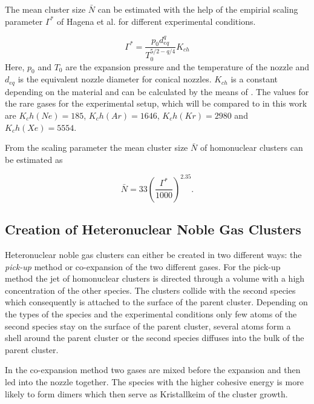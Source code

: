 \begin{figure}[h]
  \centering
  \caption{}
  \label{}
\end{figure}

The mean cluster size $\bar{N}$ can be estimated with
the help of the empirial scaling parameter $\Gamma^*$ of Hagena et al.
\cite{Hagena72} for different experimental conditions.

\begin{equation}
 \Gamma^* = \frac{p_0 d_{eq}^q}{T_0^{5/2-q/4}} K_{ch}
\end{equation}
Here, $p_0$ and $T_0$ are the expansion pressure and the temperature
of the nozzle and $d_{eq}$ is the equivalent nozzle diameter for conical
nozzles. $K_{ch}$ is a constant depending on the material and can be
calculated by the means of \cite{xyz}. The values for the rare gases for
the experimental setup, which will be compared to in this work are
$K_ch(Ne)=185$, $K_ch(Ar)=1646$, $K_ch(Kr)=2980$ and $K_ch(Xe)=5554$.

From the scaling parameter the mean cluster size $\bar{N}$ 
of homonuclear clusters can be
estimated as

\begin{equation}
  \bar{N} = 33 \left( \frac{\Gamma^*}{1000} \right) ^{2.35} .
\end{equation}


\subsection{Creation of Heteronuclear Noble Gas Clusters}
Heteronuclear noble gas clusters can either be created in two different ways:
the \emph{pick-up} method or co-expansion of the two different gases.
For the pick-up method the jet of homonuclear clusters is directed through
a volume with a high concentration of the other species. The clusters
collide with the second species which consequently is attached to the surface
of the parent cluster. Depending on the types of the species
and the experimental conditions only few atoms
of the second species stay on the surface of the parent cluster,
several atoms form a shell around the parent cluster or the second species
diffuses into the bulk of the parent cluster.

In the co-expansion method two gases are mixed before the expansion and
then led into the nozzle together. The species with the higher cohesive
energy is more likely to form dimers which then serve as Kristallkeim of
the cluster growth.



